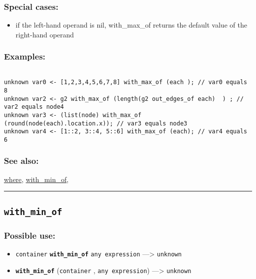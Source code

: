 \documentclass[]{book}
\providecommand{\tightlist}{%
  \setlength{\itemsep}{0pt}\setlength{\parskip}{0pt}}
\theoremstyle{definition}
\theoremstyle{definition}
\theoremstyle{definition}
\theoremstyle{remark}
\begin{document}
\subsubsection{Special cases:}\label{special-cases-147}

\begin{itemize}
\tightlist
\item
  if the left-hand operand is nil, with\_max\_of returns the default
  value of the right-hand operand
\end{itemize}

\subsubsection{Examples:}\label{examples-384}

\begin{verbatim}
 
unknown var0 <- [1,2,3,4,5,6,7,8] with_max_of (each ); // var0 equals 8 
unknown var2 <- g2 with_max_of (length(g2 out_edges_of each)  ) ; // var2 equals node4 
unknown var3 <- (list(node) with_max_of (round(node(each).location.x)); // var3 equals node3 
unknown var4 <- [1::2, 3::4, 5::6] with_max_of (each); // var4 equals 6
\end{verbatim}

\subsubsection{See also:}\label{see-also-221}

\href{operators-s-to-z.html\#where}{where},
\href{operators-s-to-z.html\#with_min_of}{with\_min\_of},

\begin{center}\rule{0.5\linewidth}{\linethickness}\end{center}

\subsection{\texorpdfstring{\texttt{with\_min\_of}}{with\_min\_of}}\label{with_min_of}

\subsubsection{Possible use:}\label{possible-use-558}

\begin{itemize}
\tightlist
\item
  \texttt{container} \textbf{\texttt{with\_min\_of}}
  \texttt{any\ expression} ---\textgreater{} \texttt{unknown}
\item
  \textbf{\texttt{with\_min\_of}} (\texttt{container} ,
  \texttt{any\ expression}) ---\textgreater{} \texttt{unknown}
\end{itemize}
\end{document}
